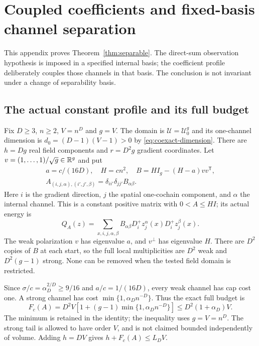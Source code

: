 \section{Coupled coefficients and fixed-basis channel separation}\label{sec:coupled}
This appendix proves Theorem~\ref{thm:separable}. The direct-sum
observation hypothesis is imposed in a specified internal basis; the
coefficient profile deliberately couples those channels in that basis.
The conclusion is not invariant under a change of separability basis.

\subsection{The actual constant profile and its full budget}
Fix $D\ge3$, $n\ge2$, $V=n^D$ and $g=V$. The domain is
$\mathcal U=\mathcal U_0^g$ and its one-channel dimension is
$d_0=(D-1)(V-1)>0$ by \eqref{eq:coexact-dimension}.
There are $h=Dg$ real field components and $r=D^2g$ gradient coordinates.
Let $v=(1,\ldots,1)/\sqrt g\in\mathbb R^g$ and put
\begin{equation}\label{eq:coupled-profile}
 \begin{gathered}
 a=c/(16D),\quad H=cn^2,\quad B=H I_g-(H-a)vv^{\mathsf T},\\
 A_{(i,j,\alpha),(i',j',\beta)}
                =\delta_{ii'}\delta_{jj'}B_{\alpha\beta}.
 \end{gathered}
\end{equation}
Here $i$ is the gradient direction, $j$ the spatial one-cochain component,
and $\alpha$ the internal channel. This is a constant positive matrix
with $0<A\le H I$; its actual energy is
\[
 Q_A(z)=\sum_{x,i,j,\alpha,\beta}B_{\alpha\beta}
                D_i^+z_j^\alpha(x)D_i^+z_j^\beta(x).
\]
The weak polarization $v$ has eigenvalue $a$, and $v^\perp$ has eigenvalue
$H$. There are $D^2$ copies of $B$ at each start, so the full local
multiplicities are $D^2$ weak and $D^2(g-1)$ strong. None can be removed
when the tested field domain is restricted.

Since $\sigma/c=\alpha_D^{2/D}\ge9/16$ and $a/c=1/(16D)$, every
weak channel has cap cost one. A strong channel has cost
$\min\{1,\alpha_Dn^{-D}\}$. Thus the exact full budget is
\begin{equation}\label{eq:coupled-budget}
 F_c(A)=D^2V[1+(g-1)\min\{1,\alpha_Dn^{-D}\}]
                    \le D^2(1+\alpha_D)V.
\end{equation}
The minimum is retained in the identity; the inequality uses $g=V=n^D$.
The strong tail is allowed to have order $V$, and is not claimed bounded
independently of volume. Adding $h=DV$ gives $h+F_c(A)\le L_DV$.

